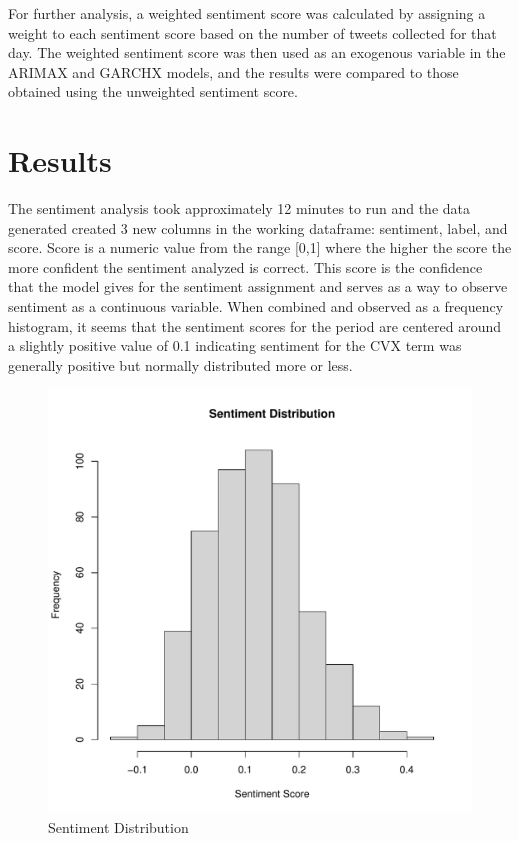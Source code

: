 \documentclass[12pt, letterpaper, titlepage]{article}
\begin{document}
For further analysis, a weighted sentiment score was calculated by assigning a weight to each sentiment score based on the number of tweets collected for that day. The weighted sentiment score was then used as an exogenous variable in the ARIMAX and GARCHX models, and the results were compared to those obtained using the unweighted sentiment score.

\label{sec: results}
\section{Results}

The sentiment analysis took approximately 12 minutes to run and the data generated created 3 new columns in the working dataframe: sentiment, label, and score. Score is a numeric value from the range [0,1] where the higher the score the more confident the sentiment analyzed is correct. This score is the confidence that the model gives for the sentiment assignment and serves as a way to observe sentiment as a continuous variable. When combined and observed as a frequency histogram, it seems that the sentiment scores for the period are centered around a slightly positive value of 0.1 indicating sentiment for the CVX term was generally positive but normally distributed more or less.


\begin{figure}[tbp]
  \begin{center}
  \includegraphics[width=\textwidth]{../figures/fig3.pdf}
  \caption{Sentiment Distribution }\label{fig:fig2}
  \end{center}
\end{figure}
\end{document}
